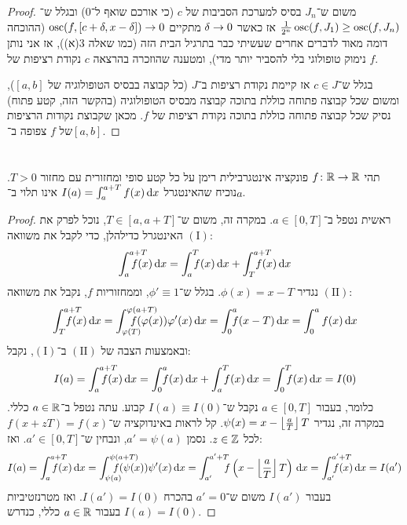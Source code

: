 \documentclass[]{../../../../tex/classes/homework}
\newcommand\Is{\dequad \ }
\begin{document}
\begin{enumerate}[(A)]
\begin{proof}
			משום ש־$J_n$ בסיס למערכת הסביבות של $c$ (כי אורכם שואף ל־$0$) ובגלל ש־$\frac{1}{2^{n}}\operatorname{osc}(f, J_1) \ge \operatorname{osc}(f, J_n)$ אז כאשר $\delta \to 0$ מתקיים $\operatorname{osc}(f, [c + \delta, x - \delta]) \to 0$ (ההוכחה דומה מאוד לדברים אחרים שעשיתי כבר בתרגיל הבית הזה (כמו שאלה 3(א)), אז אני נותן נימוק טופולוגי בלי להסביר יותר מדי), ומטענה שהוזכרה בהרצאה $c$ נקודת רציפות של $f$. 
			
			בגלל ש־$c \in J$ אז קיימת נקודת רציפות ב־$J$ (כל קבוצה בבסיס הטופולוגיה של $[a, b]$), ומשום שכל קבוצה פתוחה כוללת בתוכה קבוצה מבסיס הטופולוגיה (בהקשר הזה, קטע פתוח) נסיק שכל קבוצה פתוחה כוללת בתוכה נקודת רציפות של $f$. מכאן שקבוצת נקודות הרציפות של $f$ צפופה ב־$[a, b]$. 
		\end{proof}
	\end{enumerate}
	
	\section{}
	תהי $f \colon \mathbb{R} \to \mathbb{R}$ פונקציה אינטגרבילית רימן על כל קטע סופי ומחזורית עם מחזור $T > 0$. נוכיח שהאינטגרל $I(a) = \int^{a + T}_a f(x)\,\mathrm{d}x$ אינו תלוי ב־$a$. 
	\begin{proof}
		ראשית נטפל ב־$a \in [0, T]$. במקרה זה, משום ש־$T \in [a, a + T]$, נוכל לפרק את האינטגרל כדילהלן, כדי לקבל את משוואה $(\mathrm{I})$: 
		\[ \int^{a + T}_a \dequad \Is f(x)\dx = \int_{a}^{T}\Is f(x)\dx + \int^{a + T}_{T} \dequad\Is f(x)\dx \]
		נגדיר $\phi(x) = x - T$. בגלל ש־$\phi' \equiv 1$, וממחזוריות $f$, נקבל את משוואה $(\mathrm{II})$: 
		\[ \int_T^{a + T}\dequad \Is f(x)\dx = \int^{\phi(a + T)}_{\phi(T)}\dequadd\Is f(\phi(x))\phi'(x)\dx = \int_0^{a} \Is f(x - T)\dx = \int^{a}_0 f(x)\dx \]
		ובאמצעות הצבה של $(\mathrm{II})$ ב־$(\mathrm{I})$, נקבל: 
		\[ I(a) = \int^{a + T}_a\dequad\Is f(x)\dx = \int_0^{a}\Is f(x)\dx + \int_a^{T}\Is f(x)\dx = \int_0^{T}\Is f(x)\dx = I(0) \]
		כלומר, בעבור $a \in [0, T]$ נקבל ש־$I(a) \equiv I(0)$ קבוע. עתה נטפל ב־$a \in \mathbb{R}$ כללי. במקרה זה, נגדיר $\psi(x) = x - \left\lfloor \frac{a}{T} \right\rfloor T$. קל לראות באינדוקציה ש־$f(x + zT) = f(x)$ לכל $z \in \mathbb{Z}$. נסמן $a' = \psi(a)$, ונבחין ש־$a' \in [0, T]$. ואז: 
		\[ I(a) = \int^{a + T}_a\dequad \Is f(x)\dx = \int^{\psi(a + T)}_{\psi(a)}\dequadd\Is f(\psi(x))\psi'(x)\dx = \int^{a' + T}_{a'}\Is f\cl{x - \floor{\frac{a}{T}}T}\dx = \int^{a' + T}_{a'}\dequadd f(x)\dx = I(a') \]
		בעבור $I(a')$ משום ש־$a' = 0$ בהכרח $I(a') = I(0)$. ואז מטרנזטיביות $I(a) = I(0)$ בעבור $a \in \mathbb{R}$  כללי, כנדרש. 
	\end{proof}
	
\end{document}
